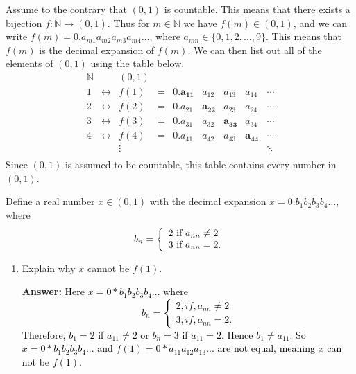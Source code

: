 \documentclass[10pt]{article}
\begin{document}
\begin{enumerate}
	Assume to the contrary that $(0,1)$ is countable.  This means that there exists a bijection $f: \mathbb{N} \to (0,1)$.  Thus for $m \in \mathbb{N}$ we have $f(m) \in (0,1)$, and we can write $f(m) = 0.a_{m1}a_{m2}a_{m3}a_{m4}\ldots$, where $a_{mn} \in \{0, 1, 2, \ldots, 9\}$.  This means that $f(m)$ is the decimal expansion of $f(m)$.  We can then list out all of the elements of $(0,1)$ using the table below.
		$$\begin{array}{ccccccccc}
		\mathbb{N} & & (0,1) & & & & & & \\\hline
		1 & \longleftrightarrow & f(1) & = & 0.\mathbf{a_{11}} & a_{12} & a_{13} & a_{14} & \cdots\\
		2 & \longleftrightarrow & f(2) & = & 0.a_{21} & \mathbf{a_{22}} & a_{23} & a_{24} & \cdots\\
		3 & \longleftrightarrow & f(3) & = & 0.a_{31} & a_{32} & \mathbf{a_{33}} & a_{34} & \cdots\\
		4 & \longleftrightarrow & f(4) & = & 0.a_{41} & a_{42} & a_{43} & \mathbf{a_{44}} & \cdots\\
		& &  \vdots & & & & & & \ddots\\
		\end{array}$$
	Since $(0,1)$ is assumed to be countable, this table contains every number in $(0,1)$.
	
	Define a real number $x \in (0,1)$ with the decimal expansion $x = 0.b_{1}b_{2}b_{3}b_{4}\ldots$, where
		$$b_n = \left\{\begin{array}{c@{\textnormal{ if }}l}
		2 & a_{nn} \neq 2\\
		3 & a_{nn} = 2.\\
		\end{array}\right.$$
		
	\begin{enumerate}
	
	\item  Explain why $x$ cannot be $f(1)$.
 
	\textbf{\underline{Answer:}}
 \textcolor{black}{Here $x = 0*b_1b_2b_3b_4...$ where 
 \begin{equation}
  b_n=%
  \begin{cases}
    2, if,  a_{nn} \neq 2 \\
    3, if,  a_{nn}=2.
  \end{cases}
\end{equation}
Therefore, $b_1 = 2$ if $a_{11} \neq 2$ or $b_n = 3$ if $a_{11} = 2$.  Hence $b_1 \neq a_{11}$.  So $x = 0*b_1b_2b_3b_4...$ and $f(1) = 0*a_{11}a_{12}a_{13}...$ are not equal, meaning $x$ can not be $f(1)$.
}
 

\end{enumerate}
\end{enumerate}
\end{document}
